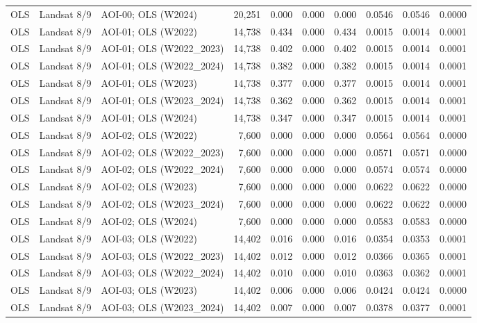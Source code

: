 \begin{landscape}
\begin{longtable}{lllrrrrrrr}
OLS & Landsat 8/9 & AOI-00; OLS (W2024) & 20,251 & 0.000 & 0.000 & 0.000 & 0.0546 & 0.0546 & 0.0000 \\
OLS & Landsat 8/9 & AOI-01; OLS (W2022) & 14,738 & 0.434 & 0.000 & 0.434 & 0.0015 & 0.0014 & 0.0001 \\
OLS & Landsat 8/9 & AOI-01; OLS (W2022\_2023) & 14,738 & 0.402 & 0.000 & 0.402 & 0.0015 & 0.0014 & 0.0001 \\
OLS & Landsat 8/9 & AOI-01; OLS (W2022\_2024) & 14,738 & 0.382 & 0.000 & 0.382 & 0.0015 & 0.0014 & 0.0001 \\
OLS & Landsat 8/9 & AOI-01; OLS (W2023) & 14,738 & 0.377 & 0.000 & 0.377 & 0.0015 & 0.0014 & 0.0001 \\
OLS & Landsat 8/9 & AOI-01; OLS (W2023\_2024) & 14,738 & 0.362 & 0.000 & 0.362 & 0.0015 & 0.0014 & 0.0001 \\
OLS & Landsat 8/9 & AOI-01; OLS (W2024) & 14,738 & 0.347 & 0.000 & 0.347 & 0.0015 & 0.0014 & 0.0001 \\
OLS & Landsat 8/9 & AOI-02; OLS (W2022) & 7,600 & 0.000 & 0.000 & 0.000 & 0.0564 & 0.0564 & 0.0000 \\
OLS & Landsat 8/9 & AOI-02; OLS (W2022\_2023) & 7,600 & 0.000 & 0.000 & 0.000 & 0.0571 & 0.0571 & 0.0000 \\
OLS & Landsat 8/9 & AOI-02; OLS (W2022\_2024) & 7,600 & 0.000 & 0.000 & 0.000 & 0.0574 & 0.0574 & 0.0000 \\
OLS & Landsat 8/9 & AOI-02; OLS (W2023) & 7,600 & 0.000 & 0.000 & 0.000 & 0.0622 & 0.0622 & 0.0000 \\
OLS & Landsat 8/9 & AOI-02; OLS (W2023\_2024) & 7,600 & 0.000 & 0.000 & 0.000 & 0.0622 & 0.0622 & 0.0000 \\
OLS & Landsat 8/9 & AOI-02; OLS (W2024) & 7,600 & 0.000 & 0.000 & 0.000 & 0.0583 & 0.0583 & 0.0000 \\
OLS & Landsat 8/9 & AOI-03; OLS (W2022) & 14,402 & 0.016 & 0.000 & 0.016 & 0.0354 & 0.0353 & 0.0001 \\
OLS & Landsat 8/9 & AOI-03; OLS (W2022\_2023) & 14,402 & 0.012 & 0.000 & 0.012 & 0.0366 & 0.0365 & 0.0001 \\
OLS & Landsat 8/9 & AOI-03; OLS (W2022\_2024) & 14,402 & 0.010 & 0.000 & 0.010 & 0.0363 & 0.0362 & 0.0001 \\
OLS & Landsat 8/9 & AOI-03; OLS (W2023) & 14,402 & 0.006 & 0.000 & 0.006 & 0.0424 & 0.0424 & 0.0000 \\
OLS & Landsat 8/9 & AOI-03; OLS (W2023\_2024) & 14,402 & 0.007 & 0.000 & 0.007 & 0.0378 & 0.0377 & 0.0001 \\

\end{longtable}
\end{landscape}
